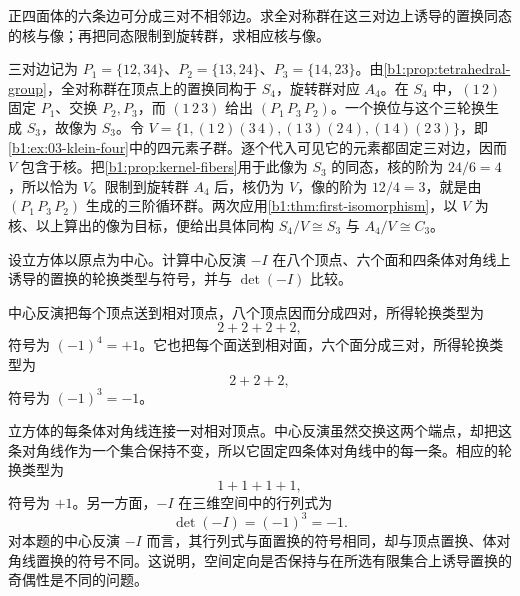 \begin{exercise}\label{b1:ex:03-tetra-opposite-edges}
	正四面体的六条边可分成三对不相邻边。求全对称群在这三对边上诱导的置换同态的核与像；再把同态限制到旋转群，求相应核与像。
\end{exercise}
\begin{solution}
	三对边记为 \(P_1=\{12,34\}\)、\(P_2=\{13,24\}\)、\(P_3=\{14,23\}\)。由\cref{b1:prop:tetrahedral-group}，全对称群在顶点上的置换同构于 \(S_4\)，旋转群对应 \(A_4\)。在 \(S_4\) 中，\((1\,2)\) 固定 \(P_1\)、交换 \(P_2,P_3\)，而 \((1\,2\,3)\) 给出 \((P_1\,P_3\,P_2)\)。一个换位与这个三轮换生成 \(S_3\)，故像为 \(S_3\)。令 \(V=\bigl\{1,(1\,2)(3\,4),(1\,3)(2\,4),(1\,4)(2\,3)\bigr\}\)，即\cref{b1:ex:03-klein-four}中的四元素子群。逐个代入可见它的元素都固定三对边，因而 \(V\) 包含于核。把\cref{b1:prop:kernel-fibers}用于此像为 \(S_3\) 的同态，核的阶为 \(24/6=4\)，所以恰为 \(V\)。限制到旋转群 \(A_4\) 后，核仍为 \(V\)，像的阶为 \(12/4=3\)，就是由 \((P_1\,P_3\,P_2)\) 生成的三阶循环群。两次应用\cref{b1:thm:first-isomorphism}，以 \(V\) 为核、以上算出的像为目标，便给出具体同构 \(S_4/V\cong S_3\) 与 \(A_4/V\cong C_3\)。
\end{solution}

\begin{exercise}\label{b1:ex:03-central-inversion-sign}
	设立方体以原点为中心。计算中心反演 \(-I\) 在八个顶点、六个面和四条体对角线上诱导的置换的轮换类型与符号，并与 \(\det(-I)\) 比较。
\end{exercise}
\begin{solution}
	中心反演把每个顶点送到相对顶点，八个顶点因而分成四对，所得轮换类型为
	\[
		2+2+2+2,
	\]
	符号为 \((-1)^4=+1\)。它也把每个面送到相对面，六个面分成三对，所得轮换类型为
	\[
		2+2+2,
	\]
	符号为 \((-1)^3=-1\)。

	立方体的每条体对角线连接一对相对顶点。中心反演虽然交换这两个端点，却把这条对角线作为一个集合保持不变，所以它固定四条体对角线中的每一条。相应的轮换类型为
	\[
		1+1+1+1,
	\]
	符号为 \(+1\)。另一方面，\(-I\) 在三维空间中的行列式为
	\[
		\det(-I)=(-1)^3=-1.
	\]
	对本题的中心反演 \(-I\) 而言，其行列式与面置换的符号相同，却与顶点置换、体对角线置换的符号不同。这说明，空间定向是否保持与在所选有限集合上诱导置换的奇偶性是不同的问题。
\end{solution}

